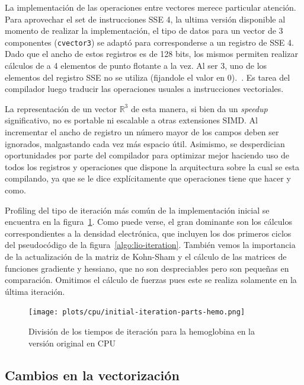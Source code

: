 La implementaci\'on de las operaciones entre vectores merece particular atenci\'on.
Para aprovechar el set de instrucciones SSE 4, la ultima versi\'on disponible al
momento de realizar la implementaci\'on, el tipo de datos para un vector de 3
componentes (\texttt{cvector3}) se adapt\'o para corresponderse a un
registro de SSE 4. Dado que el ancho de estos registros es de 128 bits, los mismos
permiten realizar c\'alculos de a 4 elementos de punto flotante a la vez. Al ser 3, uno de los
elementos del registro SSE no se utiliza (fijandole el valor en 0).~\cite{Nitsche2014}.
Es tarea del compilador luego traducir las operaciones usuales a instrucciones
vectoriales.

La representaci\'on de un vector $\mathbb{R}^3$ de esta manera, si bien da
un \textit{speedup} significativo, no es portable ni escalable a otras extensiones
SIMD. Al incrementar el ancho de registro un n\'umero mayor de los campos deben ser ignorados, malgastando cada
vez m\'as espacio \'util. Asimismo, se desperdician oportunidades por parte del compilador
para optimizar mejor haciendo uso de todos los registros y operaciones que dispone
la arquitectura sobre la cual se esta compilando, ya que se le dice expl\'icitamente
que operaciones tiene que hacer y como.

Profiling del tipo de iteraci\'on m\'as com\'un de la implementaci\'on inicial se encuentra en la figura~\ref{fig:initial-profiling}.
Como puede verse, el gran dominante son los c\'alculos correspondientes a la densidad electr\'onica,
que incluyen los dos primeros ciclos del pseudoc\'odigo de
la figura~\ref{algo:lio-iteration}. Tambi\'en vemos la importancia de
la actualizaci\'on de la matriz de Kohn-Sham y el c\'alculo de las matrices de
funciones gradiente y hessiano, que no son despreciables pero son peque\~nas en
comparaci\'on. Omitimos el c\'alculo de fuerzas pues este se realiza solamente
en la \'ultima iteraci\'on.

\begin{figure}[htbp]
   \centering
   \texttt{[image: plots/cpu/initial-iteration-parts-hemo.png]}
   \caption{Divisi\'on de los tiempos de iteraci\'on para la hemoglobina en la versi\'on
   original en CPU}
   \label{fig:initial-profiling}
\end{figure}

\subsection{Cambios en la vectorizaci\'on}

